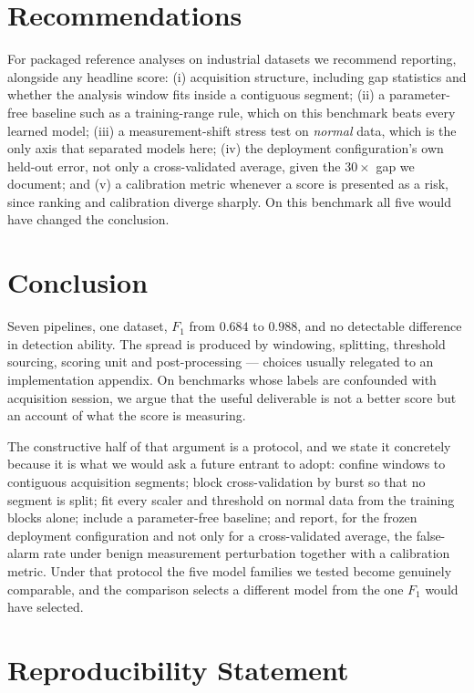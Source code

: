 \documentclass{article}
\begin{document}
\section{Recommendations}
\label{sec:recs}

For packaged reference analyses on industrial datasets we recommend reporting,
alongside any headline score: (i) acquisition structure, including gap
statistics and whether the analysis window fits inside a contiguous segment;
(ii) a parameter-free baseline such as a training-range rule, which on this
benchmark beats every learned model; (iii) a measurement-shift stress test on
\emph{normal} data, which is the only axis that separated models here; (iv) the
deployment configuration's own held-out error, not only a cross-validated
average, given the $30\times$ gap we document; and (v) a calibration metric
whenever a score is presented as a risk, since ranking and calibration diverge
sharply. On this benchmark all five would have changed the conclusion.

\section{Conclusion}
\label{sec:conclusion}

Seven pipelines, one dataset, $F_1$ from $0.684$ to $0.988$, and no detectable
difference in detection ability. The spread is produced by windowing, splitting,
threshold sourcing, scoring unit and post-processing --- choices usually
relegated to an implementation appendix. On benchmarks whose labels are
confounded with acquisition session, we argue that the useful deliverable is
not a better score but an account of what the score is measuring.

The constructive half of that argument is a protocol, and we state it
concretely because it is what we would ask a future entrant to adopt: confine
windows to contiguous acquisition segments; block cross-validation by burst so
that no segment is split; fit every scaler and threshold on normal data from
the training blocks alone; include a parameter-free baseline; and report, for
the frozen deployment configuration and not only for a cross-validated
average, the false-alarm rate under benign measurement perturbation together
with a calibration metric. Under that protocol the five model families we
tested become genuinely comparable, and the comparison selects a different
model from the one $F_1$ would have selected.

\section*{Reproducibility Statement}
\end{document}

